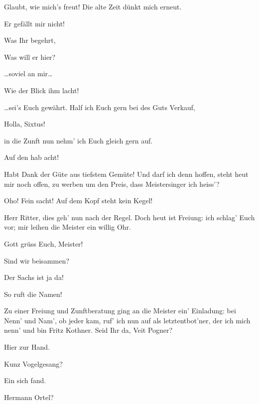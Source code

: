 \begin{drama}
Glaubt, wie mich's freut!
Die alte Zeit dünkt mich erneut.

\Beckmesserspeaks
Er gefällt mir nicht!

\Pognerspeaks
Was Ihr begehrt,

\Beckmesserspeaks
Was will er hier?

\Pognerspeaks
\ldots soviel an mir\ldots

\Beckmesserspeaks
Wie der Blick ihm lacht!

\Pognerspeaks
\ldots sei's Euch gewährt.
Half ich Euch gern bei des Guts Verkauf,

\Beckmesserspeaks
Holla, Sixtus!

\Pognerspeaks
in die Zunft nun nehm' ich Euch gleich gern auf.

\Beckmesserspeaks
Auf den hab acht!

\Waltherspeaks
Habt Dank der Güte aus tiefstem Gemüte!
Und darf ich denn hoffen, steht heut mir noch offen,
zu werben um den Preis, dass Meistersinger ich heiss'?

\Beckmesserspeaks
Oho! Fein sacht! Auf dem Kopf steht kein Kegel!

\Pognerspeaks
Herr Ritter, dies geh' nun nach der Regel.
Doch heut ist Freiung:
ich schlag' Euch vor;
mir leihen die Meister ein willig Ohr.



\Sachsspeaks
Gott grüss Euch, Meister!

\Vogelgesangspeaks
Sind wir beisammen?

\Beckmesserspeaks
Der Sachs ist ja da!

\Nachtigallspeaks
So ruft die Namen!

\Kothnerspeaks


Zu einer Freiung und Zunftberatung
ging an die Meister ein' Einladung:
bei Nenn' und Nam', ob jeder kam,
ruf' ich nun auf als letztentbot'ner,
der ich mich nenn' und bin Fritz Kothner.
Seid Ihr da, Veit Pogner?

\Pognerspeaks
Hier zur Hand.



\Kothnerspeaks
Kunz Vogelgesang?

\Vogelgesangspeaks
Ein sich fand.



\Kothnerspeaks
Hermann Ortel?


\end{drama}
